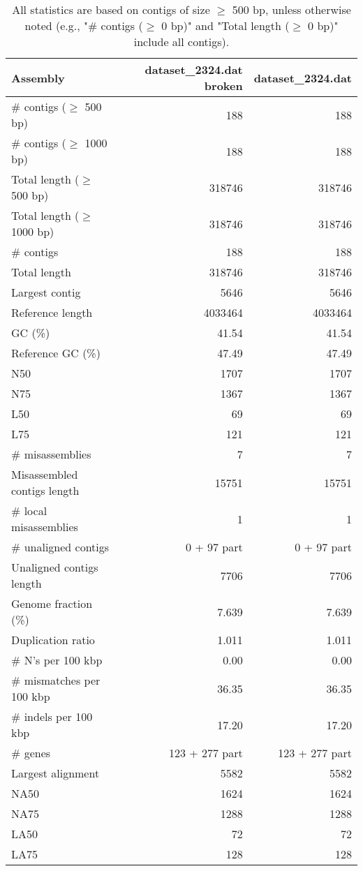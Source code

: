 \documentclass[12pt,a4paper]{article}
\begin{document}
\begin{table}[ht]
\begin{center}
\caption{All statistics are based on contigs of size $\geq$ 500 bp, unless otherwise noted (e.g., "\# contigs ($\geq$ 0 bp)" and "Total length ($\geq$ 0 bp)" include all contigs).}
\begin{tabular}{|l*{2}{|r}|}
\hline
Assembly & dataset\_2324.dat broken & dataset\_2324.dat \\ \hline
\# contigs ($\geq$ 500 bp) & 188 & 188 \\ \hline
\# contigs ($\geq$ 1000 bp) & 188 & 188 \\ \hline
Total length ($\geq$ 500 bp) & 318746 & 318746 \\ \hline
Total length ($\geq$ 1000 bp) & 318746 & 318746 \\ \hline
\# contigs & 188 & 188 \\ \hline
Total length & 318746 & 318746 \\ \hline
Largest contig & 5646 & 5646 \\ \hline
Reference length & 4033464 & 4033464 \\ \hline
GC (\%) & 41.54 & 41.54 \\ \hline
Reference GC (\%) & 47.49 & 47.49 \\ \hline
N50 & 1707 & 1707 \\ \hline
N75 & 1367 & 1367 \\ \hline
L50 & 69 & 69 \\ \hline
L75 & 121 & 121 \\ \hline
\# misassemblies & 7 & 7 \\ \hline
Misassembled contigs length & 15751 & 15751 \\ \hline
\# local misassemblies & 1 & 1 \\ \hline
\# unaligned contigs & 0 + 97 part & 0 + 97 part \\ \hline
Unaligned contigs length & 7706 & 7706 \\ \hline
Genome fraction (\%) & 7.639 & 7.639 \\ \hline
Duplication ratio & 1.011 & 1.011 \\ \hline
\# N's per 100 kbp & 0.00 & 0.00 \\ \hline
\# mismatches per 100 kbp & 36.35 & 36.35 \\ \hline
\# indels per 100 kbp & 17.20 & 17.20 \\ \hline
\# genes & 123 + 277 part & 123 + 277 part \\ \hline
Largest alignment & 5582 & 5582 \\ \hline
NA50 & 1624 & 1624 \\ \hline
NA75 & 1288 & 1288 \\ \hline
LA50 & 72 & 72 \\ \hline
LA75 & 128 & 128 \\ \hline
\end{tabular}
\end{center}
\end{table}
\end{document}
